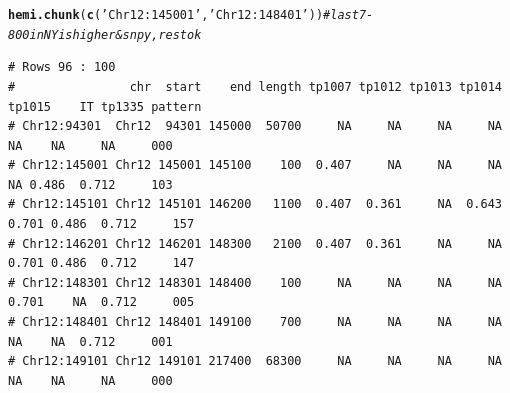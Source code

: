 \documentclass{article}\usepackage[]{graphicx}\usepackage[]{color}
\makeatletter
\newcommand{\hlstr}[1]{\textcolor[rgb]{0.192,0.494,0.8}{#1}}%
\newcommand{\hlcom}[1]{\textcolor[rgb]{0.678,0.584,0.686}{\textit{#1}}}%
\newcommand{\hlstd}[1]{\textcolor[rgb]{0.345,0.345,0.345}{#1}}%
\newcommand{\hlkwd}[1]{\textcolor[rgb]{0.737,0.353,0.396}{\textbf{#1}}}%
\newenvironment{kframe}{%
 \def\at@end@of@kframe{}%
 \ifinner\ifhmode%
  \def\at@end@of@kframe{\end{minipage}}%
  \begin{minipage}{\columnwidth}%
 \fi\fi%
 \def\FrameCommand##1{\hskip\@totalleftmargin \hskip-\fboxsep
 \colorbox{shadecolor}{##1}\hskip-\fboxsep
     \hskip-\linewidth \hskip-\@totalleftmargin \hskip\columnwidth}%
 \MakeFramed {\advance\hsize-\width
   \@totalleftmargin\z@ \linewidth\hsize
   \@setminipage}}%
 {\par\unskip\endMakeFramed%
 \at@end@of@kframe}
\newenvironment{knitrout}{}{} %
\makeatother
\begin{document}
\begin{knitrout}\footnotesize
{}\color{fgcolor}\begin{kframe}
\begin{alltt}
\hlkwd{hemi.chunk}\hlstd{(}\hlkwd{c}\hlstd{(}\hlstr{'Chr12:145001'}\hlstd{,}\hlstr{'Chr12:148401'}\hlstd{))} \hlcom{# last 7-800 in NY is higher & snpy, rest ok}
\end{alltt}
\begin{verbatim}
# Rows 96 : 100 
#                chr  start    end length tp1007 tp1012 tp1013 tp1014 tp1015    IT tp1335 pattern
# Chr12:94301  Chr12  94301 145000  50700     NA     NA     NA     NA     NA    NA     NA     000
# Chr12:145001 Chr12 145001 145100    100  0.407     NA     NA     NA     NA 0.486  0.712     103
# Chr12:145101 Chr12 145101 146200   1100  0.407  0.361     NA  0.643  0.701 0.486  0.712     157
# Chr12:146201 Chr12 146201 148300   2100  0.407  0.361     NA     NA  0.701 0.486  0.712     147
# Chr12:148301 Chr12 148301 148400    100     NA     NA     NA     NA  0.701    NA  0.712     005
# Chr12:148401 Chr12 148401 149100    700     NA     NA     NA     NA     NA    NA  0.712     001
# Chr12:149101 Chr12 149101 217400  68300     NA     NA     NA     NA     NA    NA     NA     000
\end{verbatim}
\end{kframe}


\end{knitrout}
\end{document}
